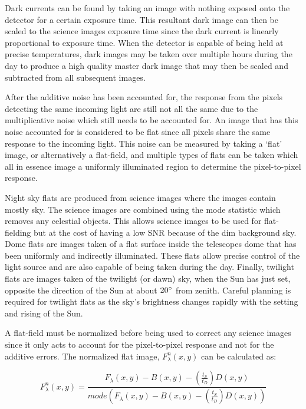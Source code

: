 Dark currents can be found by taking an image with nothing exposed onto the detector for a certain exposure time. This resultant dark image can then be scaled to the science images exposure time since the dark current is linearly proportional to exposure time. When the detector is capable of being held at precise temperatures, dark images may be taken over multiple hours during the day to produce a high quality master dark image that may then be scaled and subtracted from all subsequent images.
\prgph

After the additive noise has been accounted for, the response from the pixels detecting the same incoming light are still not all the same due to the multiplicative noise which still needs to be accounted for. An image that has this noise accounted for is considered to be flat since all pixels share the same response to the incoming light. This noise can be measured by taking a `flat' image, or alternatively a flat-field, and multiple types of flats can be taken which all in essence image a uniformly illuminated region to determine the pixel-to-pixel response.
\prgph

Night sky flats are produced from science images where the images contain mostly sky. The science images are combined using the mode statistic which removes any celestial objects. This allows science images to be used for flat-fielding but at the cost of having a low \gls{SNR} because of the dim background sky. Dome flats are images taken of a flat surface inside the telescopes dome that has been uniformly and indirectly illuminated. These flats allow precise control of the light source and are also capable of being taken during the day. Finally, twilight flats are images taken of the twilight (or dawn) sky, when the Sun has just set, opposite the direction of the Sun at about $20\hbox{$^\circ$}$ from zenith. Careful planning is required for twilight flats as the sky's brightness changes rapidly with the setting and rising of the Sun.
\prgph

A flat-field must be normalized before being used to correct any science images since it only acts to account for the pixel-to-pixel response and not for the additive errors. The normalized flat image, $F^{n}_{\lambda}(x,y)$ can be calculated as:

\begin{equation}
    F^{n}_{\lambda}(x,y) = \frac{F_{\lambda}(x,y) - B(x,y) - (\frac{t_{S}}{t_{D}})D(x,y)}{mode(F_{\lambda}(x,y) - B(x,y) - (\frac{t_{S}}{t_{D}})D(x,y))}
    \label{eq:norm_flat}
\end{equation}


